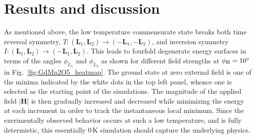 \section{Results and discussion}

As mentioned above, the low temperature commensurate state breaks both time reversal symmetry, $T: (\bm{L}_1, \bm{L}_2) \rightarrow (-\bm{L}_1, -\bm{L}_2)$, and inversion symmetry $I:(\bm{L}_1, \bm{L}_2) \rightarrow (-\bm{L}_1, \bm{L}_2)$.
This leads to fourfold degenerate energy surfaces in terms of the angles $\phi_{L_1}$ and $\phi_{L_2}$ as shown for different field strengths at $\phi_{\rm H} = 10^\circ$ in Fig.~\ref{fig:GdMn2O5_heatmap}.
The ground state at zero external field is one of the minima indicated by the white dots in the top left panel, whence one is selected as the starting point of the simulations.
The magnitude of the applied field $|\bm{H}|$ is then gradually increased and decreased while minimizing the energy at each increment in order to track the instantaneous local minimum.
Since the exerimentally observed behavior occurs at such a low temperature, and is fully determistic, this essentially 0\,K simulation should capture the underlying physics.

\begin{figure*}[h]
	\begin{subfigure}{0.24\textwidth}
	\end{subfigure}
	\begin{subfigure}{0.24\textwidth}
	\end{subfigure}
	\begin{subfigure}{0.24\textwidth}
	\end{subfigure}
	\begin{subfigure}{0.24\textwidth}
	\end{subfigure}\\
	\begin{subfigure}{0.24\textwidth}
	\end{subfigure}
	\begin{subfigure}{0.24\textwidth}
	\end{subfigure}
	\begin{subfigure}{0.24\textwidth}
	\end{subfigure}
	\begin{subfigure}{0.24\textwidth}
	\end{subfigure}
	\caption{{\bf Energy Surfaces.} The evolution of the energy surface during field sweep at +10$^\circ$ is displayed, with the white dots in the top left panel denoting the four degenerate minima. If the field would be applied along -10$^\circ$, horizontal gutters would form.\label{fig:GdMn2O5_heatmap}}
\end{figure*}

